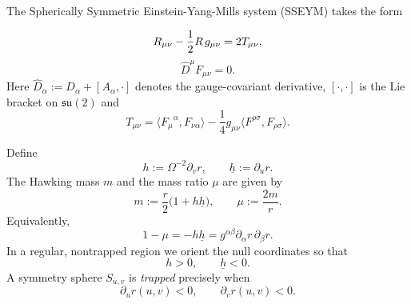 \documentclass{article}[11pt]
\newcommand{\hsp}{\hspace{.5mm}}
\numberwithin{equation}{section}
\begin{document}
\noindent The Spherically Symmetric Einstein-Yang-Mills system (SSEYM) takes the form

\vspace{3mm}

\begin{equation} \label{eq:Einsteineq}
R_{\mu\nu}-\frac{1}{2} R \hsp g_{\mu\nu} = 2 T_{\mu\nu},
\end{equation}
\begin{equation}\label{eq:YMeq}
\hat{D}^{\mu}F_{\mu\nu}=0.
\end{equation}Here $\hat{D}_{\alpha}:= D_{\alpha}+[A_\alpha,\cdot]$ denotes the gauge-covariant derivative, $[\cdot,\cdot]$ is the Lie bracket on $\mathfrak{s}\mathfrak{u}(2)$ and \[ T_{\mu\nu} = \langle {F_{\mu}}^{\alpha}, F_{\nu \alpha}\rangle - \frac{1}{4}g_{\mu\nu}\langle F^{\rho\sigma},F_{\rho\sigma}\rangle.\]


\noindent Define
\begin{equation}
    h:=\Omega^{-2}\partial_v r,
    \qquad
    \underline h:=\partial_u r.
    \label{eq:intro-null-expansions}
\end{equation}
The Hawking mass \(m\) and the mass ratio \(\mu\) are given by
\begin{equation}
    m
    :=
    \frac r2\bigl(1+h\underline h\bigr),
    \qquad
    \mu:=\frac{2m}{r}.
    \label{eq:intro-Hawking-mass}
\end{equation}
Equivalently,
\begin{equation}
    1-\mu=-h\underline h
          =g^{\alpha\beta}
             \partial_\alpha r\,\partial_\beta r.
\end{equation}
In a regular, nontrapped region we orient the null coordinates so that
\[
    h>0,
    \qquad
    \underline h<0.
\]
A symmetry sphere \(S_{u,v}\) is \textit{trapped} precisely when
\[
    \partial_u r(u,v)<0,
    \qquad
    \partial_v r(u,v)<0.
\]
\end{document}
